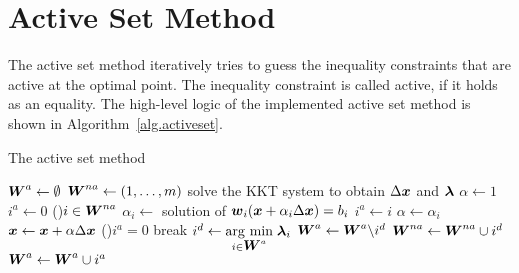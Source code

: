 \section{Active Set Method}\label{sec.as}
The active set method iteratively tries to guess the inequality constraints that 
are active at the optimal point. The inequality constraint is called active, if
it holds as an equality. The high-level logic of the implemented active set method 
is shown in Algorithm~\ref{alg.activeset}.

\begin{algorithm}[ht]
    \label{alg.activeset}
    \DontPrintSemicolon

    \caption{The active set method}


    \BlankLine

    $\mbox{\boldmath $W$}^a \gets \emptyset$ 
    $\mbox{\boldmath $W$}^{na} \gets (1, \dots, m)$ 
    {
        solve the \acs{KKT} system to obtain $\Delta \mbox{\boldmath $x$}$ and $\mbox{\boldmath $\lambda$}$ \;
        $\alpha \gets 1$ 
        $i^a \gets 0$ 
        \ForEach(){$i \in \mbox{\boldmath $W$}^{na}$}
        {
            $\alpha_i \gets$ solution of $\mbox{\boldmath $w$}_i (\mbox{\boldmath $x$} + \alpha_i \Delta \mbox{\boldmath $x$}) = b_i$\;
            {
                $i^a \gets i$ \;
                $\alpha \gets \alpha_i$ \;
            }
        }
        $\mbox{\boldmath $x$} \gets \mbox{\boldmath $x$} + \alpha \Delta \mbox{\boldmath $x$}$ \;
        \eIf(){$i^a = 0$}
        {
            {
                break 
            }
            $i^d \gets \underset{i \in \mbox{\boldmath $W$}^a}{\operatorname{arg}\,\operatorname{min}}\; \mbox{\boldmath $\lambda$}_i$ 
            $\mbox{\boldmath $W$}^a \gets \mbox{\boldmath $W$}^a \backslash i^d$ \;
            $\mbox{\boldmath $W$}^{na} \gets \mbox{\boldmath $W$}^{na} \cup i^d$ \;
        }
        {
            $\mbox{\boldmath $W$}^a \gets \mbox{\boldmath $W$}^a \cup i^a$ \;
        }
    }
\end{algorithm}

